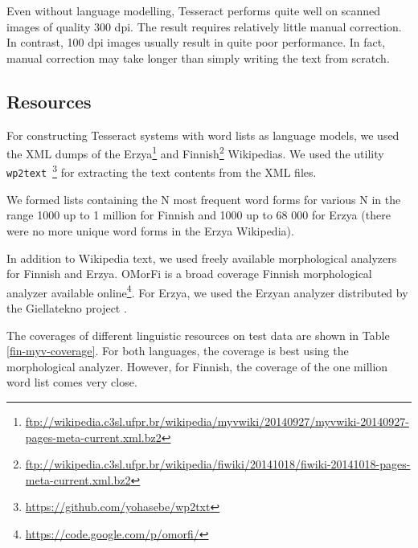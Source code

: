 \documentclass[b5paper]{article}
\begin{document}
Even without language modelling, Tesseract performs quite well on
scanned images of quality 300 dpi. The result requires relatively
little manual correction. In contrast, 100 dpi images usually result
in quite poor performance. In fact, manual correction may take
longer than simply writing the text from scratch.

\subsection{Resources}
For constructing Tesseract systems with word lists as language models,
we used the XML dumps of the
Erzya\footnote{\url{ftp://wikipedia.c3sl.ufpr.br/wikipedia/myvwiki/20140927/myvwiki-20140927-pages-meta-current.xml.bz2}}
and
Finnish\footnote{\url{ftp://wikipedia.c3sl.ufpr.br/wikipedia/fiwiki/20141018/fiwiki-20141018-pages-meta-current.xml.bz2}}
Wikipedias. We used the utility {\tt
  wp2text}~\footnote{\url{https://github.com/yohasebe/wp2txt}} for
extracting the text contents from the XML files.

We formed lists containing the N most frequent word forms for various
N in the range 1000 up to 1 million for Finnish and 1000 up to 68 000
for Erzya (there were no more unique word forms in the Erzya
Wikipedia).
 
In addition to Wikipedia text, we used freely available morphological
analyzers for Finnish and Erzya. OMorFi \cite{pirinen11} is a broad
coverage Finnish morphological analyzer available
online\footnote{\url{https://code.google.com/p/omorfi/}}. For Erzya,
we used the Erzyan analyzer distributed by the Giellatekno project
\cite{moshagen14}.

The coverages of different linguistic resources on test data are shown
in Table \ref{fin-myv-coverage}. For both languages, the coverage is
best using the morphological analyzer. However, for Finnish, the
coverage of the one million word list comes very close.
\end{document}
